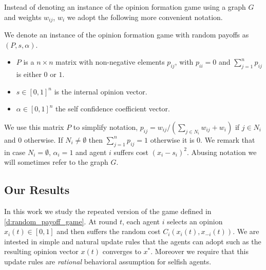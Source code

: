 Instead of denoting an instance of the opinion formation game using a graph $G$
and weights $w_{ij}$, $w_i$ we adopt the following more convenient notation.

\begin{definition}\label{d:random_payof_game_instance}
We denote an instance of the opinion formation game with random payoffs as $(P,s,\alpha)$.
\begin{itemize}
 \item $P$ is a $n \times n$  matrix with non-negative elements $p_{ij}$,
  with $p_{ii}=0$ and $\sum_{j=1}^n p_{ij}$ is either $0$ or $1$.
 \item $s \in [0,1]^n$ is the internal opinion vector.
 \item $\alpha \in [0,1]^n$ the self confidence coefficient vector.
 \end{itemize}
\end{definition}
We use this matrix $P$ to simplify notation, $p_{ij} = w_{ij}/(\sum_{j \in N_i}w_{ij}+w_i)$ if $j \in N_i$ and $0$ otherwise.
If $N_i \neq \emptyset$ then $\sum_{j=1}^n p_{ij}=1$ otherwise it is $0$. We remark that in case $N_i=\emptyset$, $\alpha_i=1$
and agent $i$ suffers cost $(x_i-s_i)^2$.
Abusing notation we will sometimes refer to the graph $G$.


\subsection{Our Results}

In this work we study the repeated version of the game defined in \ref{d:random_payoff_game}.
At round $t$, each agent $i$ selects an opinion $x_i(t) \in [0,1]$ and then suffers the
random cost $C_i(x_i(t),x_{-i}(t))$. We are intested in simple and natural update rules
that the agents can adopt such as the resulting opinion vector $x(t)$ converges to $x^*$.
Moreover we require that this update rules are \emph{rational} behavioral assumption for
selfish agents.

